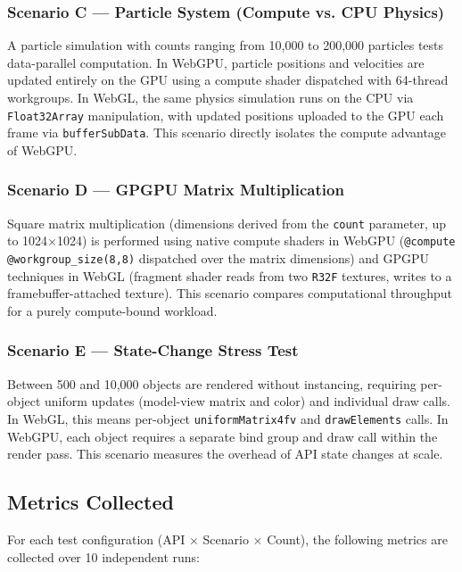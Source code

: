 \documentclass[conference]{IEEEtran}
\begin{document}
\subsubsection{Scenario C --- Particle System (Compute vs. CPU Physics)}
A particle simulation with counts ranging from 10{,}000 to 200{,}000 particles tests data-parallel computation. In WebGPU, particle positions and velocities are updated entirely on the GPU using a compute shader dispatched with 64-thread workgroups. In WebGL, the same physics simulation runs on the CPU via \texttt{Float32Array} manipulation, with updated positions uploaded to the GPU each frame via \texttt{bufferSubData}. This scenario directly isolates the compute advantage of WebGPU.

\subsubsection{Scenario D --- GPGPU Matrix Multiplication}
Square matrix multiplication (dimensions derived from the \texttt{count} parameter, up to 1024$\times$1024) is performed using native compute shaders in WebGPU (\texttt{@compute @workgroup\_size(8,8)} dispatched over the matrix dimensions) and GPGPU techniques in WebGL (fragment shader reads from two \texttt{R32F} textures, writes to a framebuffer-attached texture). This scenario compares computational throughput for a purely compute-bound workload.

\subsubsection{Scenario E --- State-Change Stress Test}
Between 500 and 10{,}000 objects are rendered without instancing, requiring per-object uniform updates (model-view matrix and color) and individual draw calls. In WebGL, this means per-object \texttt{uniformMatrix4fv} and \texttt{drawElements} calls. In WebGPU, each object requires a separate bind group and draw call within the render pass. This scenario measures the overhead of API state changes at scale.

\subsection{Metrics Collected}

For each test configuration (API $\times$ Scenario $\times$ Count), the following metrics are collected over 10 independent runs:
\end{document}
